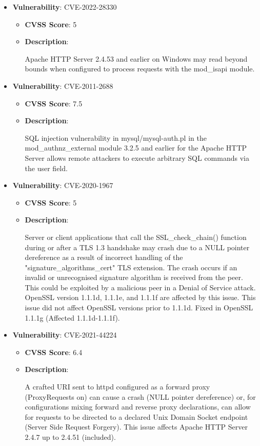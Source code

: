 \documentclass{article}
\begin{document}
\begin{itemize}
        \item \textbf{Vulnerability}: CVE-2022-28330
        \begin{itemize}
            \item \textbf{CVSS Score}:  5 
            \item \textbf{Description}:
            \parbox[t]{0.9\linewidth}{
                \ttfamily Apache HTTP Server 2.4.53 and earlier on Windows may read beyond bounds when configured to process requests with the mod\_isapi module.
            }
        \end{itemize}
    
        \item \textbf{Vulnerability}: CVE-2011-2688
        \begin{itemize}
            \item \textbf{CVSS Score}:  7.5 
            \item \textbf{Description}:
            \parbox[t]{0.9\linewidth}{
                \ttfamily SQL injection vulnerability in mysql/mysql-auth.pl in the mod\_authnz\_external module 3.2.5 and earlier for the Apache HTTP Server allows remote attackers to execute arbitrary SQL commands via the user field.
            }
        \end{itemize}
    
        \item \textbf{Vulnerability}: CVE-2020-1967
        \begin{itemize}
            \item \textbf{CVSS Score}:  5 
            \item \textbf{Description}:
            \parbox[t]{0.9\linewidth}{
                \ttfamily Server or client applications that call the SSL\_check\_chain() function during or after a TLS 1.3 handshake may crash due to a NULL pointer dereference as a result of incorrect handling of the "signature\_algorithms\_cert" TLS extension. The crash occurs if an invalid or unrecognised signature algorithm is received from the peer. This could be exploited by a malicious peer in a Denial of Service attack. OpenSSL version 1.1.1d, 1.1.1e, and 1.1.1f are affected by this issue. This issue did not affect OpenSSL versions prior to 1.1.1d. Fixed in OpenSSL 1.1.1g (Affected 1.1.1d-1.1.1f).
            }
        \end{itemize}
    
        \item \textbf{Vulnerability}: CVE-2021-44224
        \begin{itemize}
            \item \textbf{CVSS Score}:  6.4 
            \item \textbf{Description}:
            \parbox[t]{0.9\linewidth}{
                \ttfamily A crafted URI sent to httpd configured as a forward proxy (ProxyRequests on) can cause a crash (NULL pointer dereference) or, for configurations mixing forward and reverse proxy declarations, can allow for requests to be directed to a declared Unix Domain Socket endpoint (Server Side Request Forgery). This issue affects Apache HTTP Server 2.4.7 up to 2.4.51 (included).
            }
        \end{itemize}
    

\end{itemize}
\end{document}
